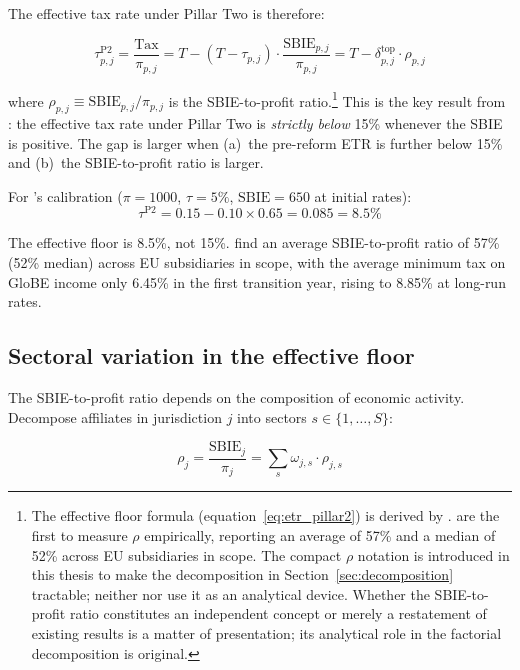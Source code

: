 \documentclass[11pt,a4paper]{article}
\begin{document}
The effective tax rate under Pillar Two is therefore:

\begin{equation}\label{eq:etr_pillar2}
\tau_{p,j}^{\text{P2}} = \frac{\text{Tax}}{\pi_{p,j}} = T - (T - \tau_{p,j}) \cdot \frac{\text{SBIE}_{p,j}}{\pi_{p,j}} = T - \delta_{p,j}^{\text{top}} \cdot \rho_{p,j}
\end{equation}

where $\rho_{p,j} \equiv \text{SBIE}_{p,j} / \pi_{p,j}$ is the SBIE-to-profit ratio.\footnote{The effective floor formula (equation~\eqref{eq:etr_pillar2}) is derived by \citet{schjelderup2024}. \citet{devereux2023} are the first to measure $\rho$ empirically, reporting an average of 57\% and a median of 52\% across EU subsidiaries in scope. The compact $\rho$ notation is introduced in this thesis to make the decomposition in Section~\ref{sec:decomposition} tractable; neither \citet{schjelderup2024} nor \citet{devereux2023} use it as an analytical device. Whether the SBIE-to-profit ratio constitutes an independent concept or merely a restatement of existing results is a matter of presentation; its analytical role in the factorial decomposition is original.} This is the key result from \citet{schjelderup2024}: the effective tax rate under Pillar Two is \emph{strictly below} 15\% whenever the SBIE is positive. The gap is larger when (a)~the pre-reform ETR is further below 15\% and (b)~the SBIE-to-profit ratio is larger.

For \citeauthor{schjelderup2024}'s calibration ($\pi = 1000$, $\tau = 5\%$, $\text{SBIE} = 650$ at initial rates):
\[
\tau^{\text{P2}} = 0.15 - 0.10 \times 0.65 = 0.085 = 8.5\%
\]

The effective floor is 8.5\%, not 15\%. \citet{devereux2023} find an average SBIE-to-profit ratio of 57\% (52\% median) across EU subsidiaries in scope, with the average minimum tax on GloBE income only 6.45\% in the first transition year, rising to 8.85\% at long-run rates.

\subsection{Sectoral variation in the effective floor}\label{sec:floor_sectoral}

The SBIE-to-profit ratio depends on the composition of economic activity. Decompose affiliates in jurisdiction $j$ into sectors $s \in \{1, \ldots, S\}$:

\begin{equation}\label{eq:rho_sectoral}
\rho_j = \frac{\text{SBIE}_j}{\pi_j} = \sum_s \omega_{j,s} \cdot \rho_{j,s}
\end{equation}
\end{document}
